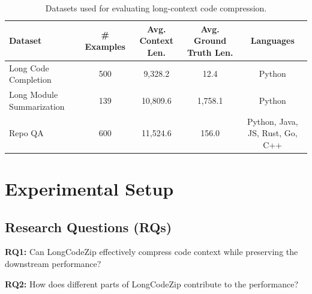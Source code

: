 \documentclass[10pt,conference]{IEEEtran}
\newcommand{\approach}{{LongCodeZip}\xspace} %
\begin{document}



\begin{table}[t]
\centering
\caption{Datasets used for evaluating long-context code compression.}
\begin{tabular}{lcccc}
\toprule
\textbf{Dataset} & \textbf{\# Examples} & \textbf{Avg. Context Len.} & \textbf{Avg. Ground Truth Len.} & \textbf{Languages} \\
\midrule
Long Code Completion & 500 & 9,328.2 & 12.4 & Python \\
Long Module Summarization & 139 & 10,809.6 & 1,758.1 & Python \\
Repo QA & 600 & 11,524.6 & 156.0 & Python, Java, JS, Rust, Go, C++ \\
\bottomrule
\end{tabular}
\label{tab:statistics}
\vspace{-1.5em}
\end{table}


\section{Experimental Setup}

\subsection{Research Questions (RQs)}

\textbf{RQ1:} Can \approach effectively compress code context while preserving the downstream performance?

\textbf{RQ2:} How does different parts of \approach contribute to the performance?
\end{document}
